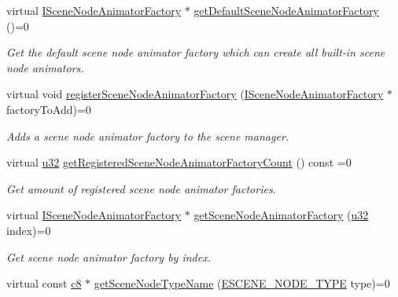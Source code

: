 \begin{DoxyCompactItemize}
virtual \hyperlink{classirr_1_1scene_1_1ISceneNodeAnimatorFactory}{I\+Scene\+Node\+Animator\+Factory} $\ast$ \hyperlink{classirr_1_1scene_1_1ISceneManager_adeb3d24c8ffafd5e671f344931a0b3a5}{get\+Default\+Scene\+Node\+Animator\+Factory} ()=0
\begin{DoxyCompactList}\small\item\em Get the default scene node animator factory which can create all built-\/in scene node animators. \end{DoxyCompactList}\item 
virtual void \hyperlink{classirr_1_1scene_1_1ISceneManager_af48c93cc41f986f08ed964cc575ee7a0}{register\+Scene\+Node\+Animator\+Factory} (\hyperlink{classirr_1_1scene_1_1ISceneNodeAnimatorFactory}{I\+Scene\+Node\+Animator\+Factory} $\ast$factory\+To\+Add)=0
\begin{DoxyCompactList}\small\item\em Adds a scene node animator factory to the scene manager. \end{DoxyCompactList}\item 
\mbox{\label{classirr_1_1scene_1_1ISceneManager_abf31f8c0dfb5242d07339fbba20a63e5}} 
virtual \hyperlink{namespaceirr_a0416a53257075833e7002efd0a18e804}{u32} \hyperlink{classirr_1_1scene_1_1ISceneManager_abf31f8c0dfb5242d07339fbba20a63e5}{get\+Registered\+Scene\+Node\+Animator\+Factory\+Count} () const =0
\begin{DoxyCompactList}\small\item\em Get amount of registered scene node animator factories. \end{DoxyCompactList}\item 
virtual \hyperlink{classirr_1_1scene_1_1ISceneNodeAnimatorFactory}{I\+Scene\+Node\+Animator\+Factory} $\ast$ \hyperlink{classirr_1_1scene_1_1ISceneManager_a96d8272b74bd0adc9138f17e832dc887}{get\+Scene\+Node\+Animator\+Factory} (\hyperlink{namespaceirr_a0416a53257075833e7002efd0a18e804}{u32} index)=0
\begin{DoxyCompactList}\small\item\em Get scene node animator factory by index. \end{DoxyCompactList}\item 
\mbox{\label{classirr_1_1scene_1_1ISceneManager_a9f8cc1f55b8e067528b7a9a21b7fdd50}} 
virtual const \hyperlink{namespaceirr_a9395eaea339bcb546b319e9c96bf7410}{c8} $\ast$ \hyperlink{classirr_1_1scene_1_1ISceneManager_a9f8cc1f55b8e067528b7a9a21b7fdd50}{get\+Scene\+Node\+Type\+Name} (\hyperlink{namespaceirr_1_1scene_acad3d7ef92a9807d391ba29120f3b7bd}{E\+S\+C\+E\+N\+E\+\_\+\+N\+O\+D\+E\+\_\+\+T\+Y\+PE} type)=0

\end{DoxyCompactItemize}
